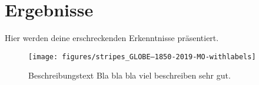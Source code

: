 \chapter{Ergebnisse}\label{ch:ergebnisse}
Hier werden deine erschreckenden Erkenntnisse präsentiert.

\begin{figure}[htbp]
	\centering
	\texttt{[image: figures/stripes\_GLOBE---1850-2019-MO-withlabels]}
	\caption[Titel der Figure]{Beschreibungstext Bla bla bla viel beschreiben sehr gut. \cite{Hawkins.2019}}
	\label{fig:DieLableIhAuhhNoo}
\end{figure}
